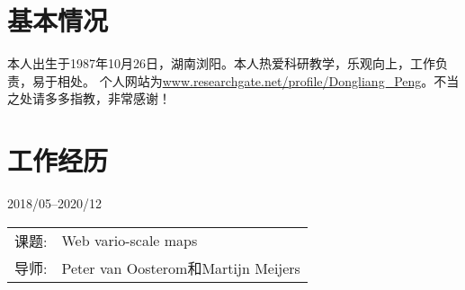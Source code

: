 \documentclass{resume}
\begin{document}


 
\section{基本情况}
本人出生于1987年10月26日，湖南浏阳。本人热爱科研教学，乐观向上，工作负责，易于相处。
个人网站为\url{www.researchgate.net/profile/Dongliang_Peng}。不当之处请多多指教，非常感谢！\footnotemark
{}

\section{工作经历}
{2018/05--2020/12}
\begin{tabular}{ll}	
	课题:  & Web vario-scale maps \\
	导师:      & Peter van Oosterom和Martijn Meijers
\end{tabular}%


\end{document}
